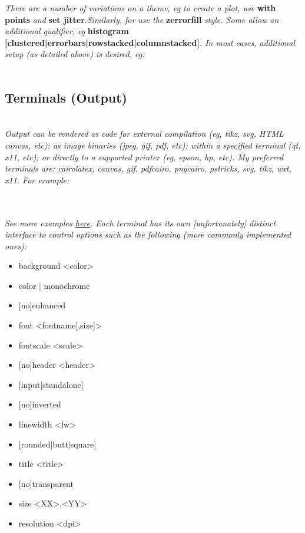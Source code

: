 \textit{There are a number of variations on a theme, eg to create a  plot, use }\textbf{with points}\textit{ and }\textbf{set jitter}.\textit{Similarly, for  use the }\textbf{zerrorfill}\textit{ style. Some allow an additional qualifier, eg }\textbf{histogram [clustered|errorbars|rowstacked|columnstacked]}\textit{. In most cases, additional setup (as detailed above) is desired, eg:}\\
\\


\subsection*{Terminals (Output)}

\\

\textit{Output can be rendered as code for external compilation (eg, tikz, svg, HTML canvas, etc); as image binaries (jpeg, gif, pdf, etc); within a specified terminal (qt, x11, etc); or directly to a supported printer (eg, epson, hp, etc). My preferred terminals are: cairolatex, canvas, gif, pdfcairo, pngcairo, pstricks, svg, tikz, wxt, x11. For example:}

\\
\\

\textit{See more examples \href{http://www.gnuplotting.org/output-terminals/}{here}. Each terminal has its own [unfortunately] distinct interface to control options such as the following (more commonly implemented ones):}\\

\begin{itemize}
    \item background <color>
    \item color | monochrome
    \item {[no]}enhanced
    \item font <fontname[,size]>
    \item fontscale <scale>
    \item {[no]}header <header>
    \item {[input|standalone]}
    \item {[no]}inverted
    \item linewidth <lw>
    \item {[rounded|butt|square]}
    \item title <title>
    \item {[no]}transparent
    \item size <XX>,<YY>
    \item resolution <dpi>
\end{itemize}


